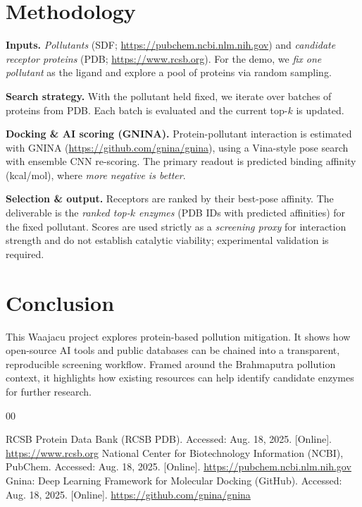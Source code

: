 \documentclass[conference]{IEEEtran}
\begin{document}
\section{Methodology}

\textbf{Inputs.}
\emph{Pollutants} (SDF; \url{https://pubchem.ncbi.nlm.nih.gov}) and \emph{candidate receptor proteins}
(PDB; \url{https://www.rcsb.org}). For the demo, we \emph{fix one pollutant} as the ligand and explore a pool
of proteins via random sampling.

\textbf{Search strategy.}
With the pollutant held fixed, we iterate over batches of proteins from PDB. 
Each batch is evaluated and the current top-$k$ is updated.

\textbf{Docking \& AI scoring (GNINA).}
Protein-pollutant interaction is estimated with GNINA
(\url{https://github.com/gnina/gnina}), using a Vina-style pose search with
ensemble CNN re-scoring. The primary readout is predicted binding affinity (kcal/mol),
where \emph{more negative is better}. 

\textbf{Selection \& output.}
Receptors are ranked by their best-pose affinity. The deliverable is the
\emph{ranked top-$k$ enzymes} (PDB IDs with predicted affinities) for the fixed pollutant.
Scores are used strictly as a \emph{screening proxy} for interaction strength and do not
establish catalytic viability; experimental validation is required. 

\section{Conclusion}
This Waajacu project explores protein-based pollution mitigation.
It shows how open-source AI tools and public databases can be chained into a transparent, 
reproducible screening workflow. Framed around the Brahmaputra pollution context,
it highlights how existing resources can help identify candidate enzymes for further research.

\begin{thebibliography}{00}

RCSB Protein Data Bank (RCSB PDB). Accessed: Aug. 18, 2025. [Online]. \url{https://www.rcsb.org}
National Center for Biotechnology Information (NCBI), PubChem. Accessed: Aug. 18, 2025. [Online]. \url{https://pubchem.ncbi.nlm.nih.gov}
Gnina: Deep Learning Framework for Molecular Docking (GitHub). Accessed: Aug. 18, 2025. [Online]. \url{https://github.com/gnina/gnina}
\end{thebibliography}
\end{document}
